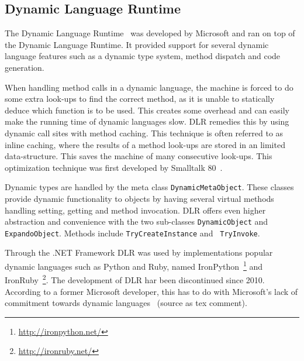 
\subsection{Dynamic Language Runtime} %

The Dynamic Language Runtime~\cite{dlr} was developed by Microsoft and ran on
top of the Dynamic Language Runtime. It provided support for several dynamic
language features such as a dynamic type system, method dispatch and code
generation.

When handling method calls in a dynamic language, the machine is forced to do
some extra look-ups to find the correct method, as it is unable to statically
deduce which function is to be used. This creates some overhead and can easily
make the running time of dynamic languages slow. DLR remedies this by using
dynamic call sites with method caching. This technique is often referred to as
inline caching, where the results of a method look-ups are stored in an limited
data-structure. This saves the machine of many consecutive look-ups. This
optimization technique was first developed by Smalltalk 80~\cite{deutsch}.

Dynamic types are handled by the meta class {\tt DynamicMetaObject}. These
classes provide dynamic functionality to objects by having several virtual
methods handling setting, getting and method invocation. DLR offers even higher
abstraction and convenience with the two sub-classes {\tt DynamicObject} and
{\tt ExpandoObject}. Methods include {\tt TryCreateInstance} and {\tt
  TryInvoke}.

Through the .NET Framework DLR was used by implementations popular dynamic
languages such as Python and Ruby, named
IronPython~\footnote{\url{http://ironpython.net/}} and
IronRuby~\footnote{\url{http://ironruby.net/}}. The development of DLR har been
discontinued since 2010. According to a former Microsoft developer, this has to
do with Microsoft's lack of commitment towards dynamic languages~\cite{NEEDED}
(source as tex comment).
